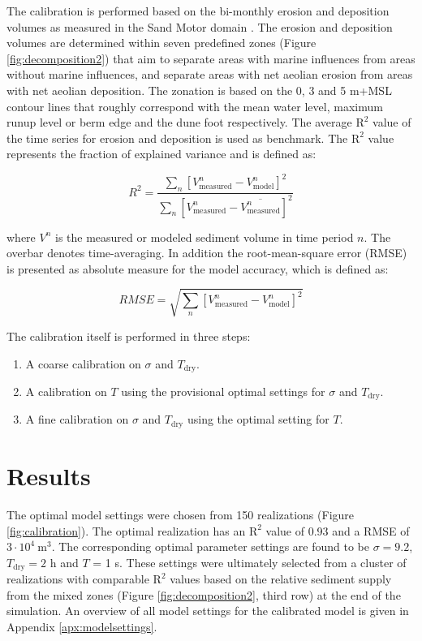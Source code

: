 The calibration is performed based on the bi-monthly erosion and
deposition volumes as measured in the Sand Motor domain
\citep{Hoonhout2017a}. The erosion and deposition volumes are
determined within seven predefined zones (Figure
\ref{fig:decomposition2}) that aim to separate areas with marine
influences from areas without marine influences, and separate areas
with net aeolian erosion from areas with net aeolian deposition. The
zonation is based on the 0, 3 and 5 m+MSL contour lines that roughly
correspond with the mean water level, maximum runup level or berm edge
and the dune foot respectively. The average $\mathrm{R^2}$ value of
the time series for erosion and deposition is used as benchmark. The
$\mathrm{R^2}$ value represents the fraction of explained variance and
is defined as:

\begin{equation}
  \label{eq:r2}
  R^2 = \frac{\sum_n \left[ V^n_{\mathrm{measured}} - V^n_{\mathrm{model}} \right]^2}{\sum_n \left[ V^n_{\mathrm{measured}} - \overline{V^n_{\mathrm{measured}}} \right]^2}
\end{equation}

\noindent where $V^n$ is the measured or modeled sediment volume in
time period $n$. The overbar denotes time-averaging. In addition the
root-mean-square error (RMSE) is presented as absolute measure for the
model accuracy, which is defined as:

\begin{equation}
  \label{eq:rmse}
  RMSE = \sqrt{\sum_n \left[ V^n_{\mathrm{measured}} - V^n_{\mathrm{model}} \right]^2}
\end{equation}

\noindent The calibration itself is performed in three steps:

\begin{enumerate}
\item A coarse calibration on $\sigma$ and $T_{\mathrm{dry}}$.
\item A calibration on $T$ using the provisional optimal settings for
  $\sigma$ and $T_{\mathrm{dry}}$.
\item A fine calibration on $\sigma$ and $T_{\mathrm{dry}}$ using the
  optimal setting for $T$.
\end{enumerate}

\section{Results}

The optimal model settings were chosen from 150 realizations (Figure
\ref{fig:calibration}). The optimal realization has an $\mathrm{R^2}$
value of 0.93 and a RMSE of $3 \cdot 10^4 ~ \mathrm{m^3}$.
The corresponding optimal parameter settings are found to be
$\sigma = 9.2$, $T_{\mathrm{dry}} = 2$ h and $T$ = 1 s. These
settings were ultimately selected from a cluster of realizations with
comparable $\mathrm{R^2}$ values based on the relative sediment supply
from the mixed zones (Figure \ref{fig:decomposition2}, third row) at
the end of the simulation. An overview of all model settings for the
calibrated model is given in Appendix \ref{apx:modelsettings}.

